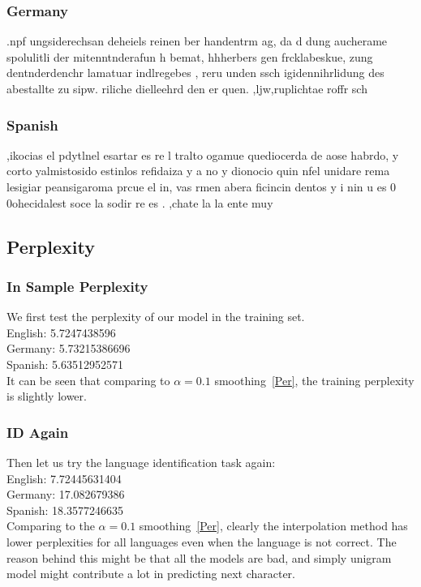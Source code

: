 \documentclass{article}
\begin{document}
\subsubsection{Germany}
.npf ungsiderechsan deheiels reinen ber handentrm ag, da d dung aucherame spolulitli der mitenntnderafun h bemat, hhherbers gen frcklabeskue, zung dentnderdenchr lamatuar indlregebes , reru unden ssch igidennihrlidung des abestallte zu sipw. riliche dielleehrd den er quen.
,ljw,ruplichtae roffr sch
\subsubsection{Spanish}
,ikocias el pdytlnel esartar es re l tralto ogamue quediocerda de aose habrdo, y corto yalmistosido estinlos refidaiza y a no y dionocio quin nfel unidare rema lesigiar peansigaroma prcue el in, vas rmen abera ficincin dentos y i nin u es 0  0ohecidalest soce la sodir re es
.
,chate la la ente muy
\subsection{Perplexity}
\subsubsection{In Sample Perplexity}
We first test the perplexity of our model in the training set.\\
English: 5.7247438596\\
Germany: 5.73215386696\\
Spanish: 5.63512952571\\

It can be seen that comparing to $\alpha=0.1$ smoothing~\ref{Per}, the training perplexity is slightly lower.
\subsubsection{ID Again}
Then let us try the language identification task again:\\
English: 7.72445631404\\
Germany: 17.082679386\\
Spanish: 18.3577246635\\

Comparing to the $\alpha=0.1$ smoothing~\ref{Per}, clearly the interpolation method has lower perplexities for all languages even when the language is not correct. The reason behind this might be that all the models are bad, and simply unigram model might contribute a lot in predicting next character.





\end{document}

